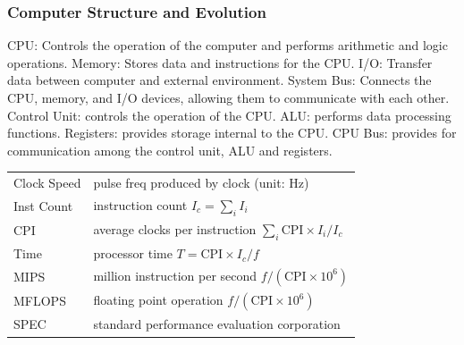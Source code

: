 \documentclass[10pt]{article}
\begin{document}
\begin{multicols*}{2}
    \subsubsection*{Computer Structure and Evolution}
    \begin{tcolorbox}[title=Internal Structure of Computer and CPU, halign=flush left]
        \tiny
        CPU: Controls the operation of the computer and performs arithmetic and logic operations.
        Memory: Stores data and instructions for the CPU.
        I/O: Transfer data between computer and external environment.
        System Bus: Connects the CPU, memory, and I/O devices, allowing them to communicate with each other.
        Control Unit: controls the operation of the CPU.
        ALU: performs data processing functions.
        Registers: provides storage internal to the CPU.
        CPU Bus: provides for communication among the control unit, ALU and registers.
    \end{tcolorbox}

    \begin{tcolorbox}[title=Benchmark]
        \begin{tabular}{ll}
            Clock Speed & pulse freq produced by clock (unit: Hz)                             \\
            Inst Count  & instruction count $I_c = \sum_i I_i$                                \\
            CPI         & average clocks per instruction $\sum_i \text{CPI} \times I_i / I_c$ \\
            Time        & processor time $T = \text{CPI} \times I_c/f$                        \\
            MIPS        & million instruction per second $f / (\text{CPI} \times 10^6)$       \\
            MFLOPS      & floating point operation $f / (\text{CPI} \times 10^6)$             \\
            SPEC        & standard performance evaluation corporation                         \\
        \end{tabular}
    \end{tcolorbox}


\end{multicols*}
\end{document}
